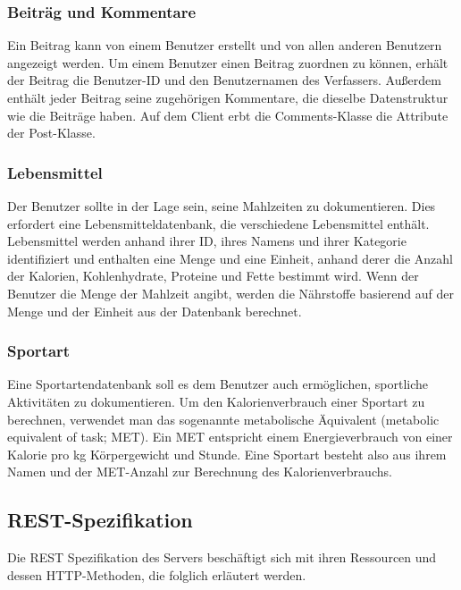 	\subsubsection{Beiträg und Kommentare}
	Ein Beitrag kann von einem Benutzer erstellt und von allen anderen Benutzern angezeigt werden. Um einem Benutzer einen Beitrag zuordnen zu können, erhält der Beitrag die Benutzer-ID und den Benutzernamen des Verfassers. Außerdem enthält jeder Beitrag seine zugehörigen Kommentare, die dieselbe Datenstruktur wie die Beiträge haben. Auf dem Client erbt die Comments-Klasse die Attribute der Post-Klasse. 
	
	\subsubsection{Lebensmittel}
	Der Benutzer sollte in der Lage sein, seine Mahlzeiten zu dokumentieren. Dies erfordert eine Lebensmitteldatenbank, die verschiedene Lebensmittel enthält. Lebensmittel werden anhand ihrer ID, ihres Namens und ihrer Kategorie identifiziert und enthalten eine Menge und eine Einheit, anhand derer die Anzahl der Kalorien, Kohlenhydrate, Proteine und Fette bestimmt wird. Wenn der Benutzer die Menge der Mahlzeit angibt, werden die Nährstoffe basierend auf der Menge und der Einheit aus der Datenbank berechnet. 
	
	\subsubsection{Sportart}
	Eine Sportartendatenbank soll es dem Benutzer auch ermöglichen, sportliche Aktivitäten zu dokumentieren. Um den Kalorienverbrauch einer Sportart zu berechnen, verwendet man das sogenannte metabolische Äquivalent (metabolic equivalent of task; MET). Ein MET entspricht einem Energieverbrauch von einer Kalorie pro kg Körpergewicht und Stunde. Eine Sportart besteht also aus ihrem Namen und der MET-Anzahl zur Berechnung des Kalorienverbrauchs.
	
\subsection{REST-Spezifikation}
	Die REST Spezifikation des Servers beschäftigt sich mit ihren Ressourcen und dessen HTTP-Methoden, die folglich erläutert werden.
